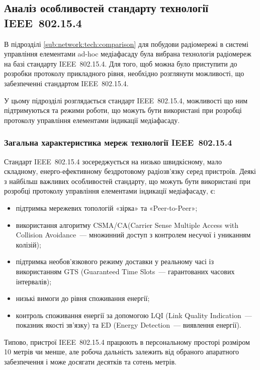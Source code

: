 \documentclass[a4paper,ukrainian,utf8,nocolumnsxix,nocolumnxxxii,nocolumnxxxi,floatsection,equationsection]{eskdtext}
\renewcommand\paragraph{\subsubsection}
\newcommand{\iee}[0]{IEEE~802.15.4\xspace}
\newcommand{\csma}[0]{CSMA/CA\xspace}
\newcommand{\engtxt}[1]{\foreignlanguage{english}{#1}}
\begin{document}

\subsection{Аналіз особливостей стандарту технології \iee}
\label{sub:ieee:standard:analysis}

В підрозділі \ref{sub:network:tech:comparison} для побудови радіомережі в системі управління елементами ad-hoc медіафасаду була вибрана технологія радіомереж на базі стандарту \iee. Для того, щоб можна було приступити до розробки протоколу прикладного рівня, необхідно розглянути можливості, що забезпеченні стандартом \iee.

У цьому підрозділі розглядається стандарт \iee, можливості що ним підтримуються та режими роботи, що можуть бути використані при розробці протоколу управління елементами індикації медіафасаду. 

\paragraph{Загальна характеристика мереж технології \iee}
\label{par:ieee:standard}


Стандарт \iee зосереджується на низько швидкісному, мало складному, енерго-ефективному бездротовому радіозв'язку серед пристроїв. Деякі з найбільш важливих особливостей стандарту, що можуть бути використані при розробці протоколу управління елементами індикації медіафасаду, є:
\begin{itemize}
	\item підтримка мережевих топологій «зірка» та «Peer-to-Peer»;
	\item використання алгоритму \csma (\engtxt{Carrier Sense Multiple Access with Collision Avoidance}~--- множинний доступ з контролем несучої і униканням колізій);
	\item підтримка необов'язкового режиму доставки у реальному часі із використанням GTS (Guaranteed Time Slots~--- гарантованих  часових інтервалів);
	\item низькі вимоги до рівня споживання енергії;
	\item контроль споживання енергії за допомогою LQI (Link Quality Indication~--- показник якості зв'язку) та ED (Energy Detection~--- виявлення енергії).
\end{itemize}

Типово, пристрої \iee працюють в персональному просторі розміром 10 метрів чи менше, але робоча дальність залежить від обраного апаратного забезпечення і може досягати десятків та сотень метрів.
\end{document}
